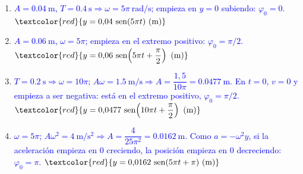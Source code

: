 \begin{exercise}
\begin{center}
        \vspace{6pt}
        \hfill
    \end{center}
    \begin{solu}
        \begin{enumerate}[label=\letraminuscula]
            \item \textcolor{blue}{\(A = \qty{0.04}{\m}\), \(T = \qty{0.4}{\second} \Rightarrow \omega = 5\pi\ \unit{\radian\per\second}\); empieza en \(y = 0\) subiendo: \(\varphi_0 = 0\).}
            \(\textcolor{red}{y = 0{,}04\,\sen(5\pi t)\ \text{(m)}}\)
            \item \textcolor{blue}{\(A = \qty{0.06}{\m}\), \(\omega = 5\pi\); empieza en el extremo positivo: \(\varphi_0 = \pi/2\).}
            \(\textcolor{red}{y = 0{,}06\,\sen\!\left(5\pi t + \dfrac{\pi}{2}\right)\ \text{(m)}}\)
            \item \textcolor{blue}{\(T = \qty{0.2}{\second} \Rightarrow \omega = 10\pi\); \(A\omega = \qty{1.5}{\m\per\second} \Rightarrow A = \dfrac{1{,}5}{10\pi} = \qty{0.0477}{\m}\).
            En \(t = 0\), \(v = 0\) y empieza a ser negativa: está en el extremo positivo, \(\varphi_0 = \pi/2\).}
            \(\textcolor{red}{y = 0{,}0477\,\sen\!\left(10\pi t + \dfrac{\pi}{2}\right)\ \text{(m)}}\)
            \item \textcolor{blue}{\(\omega = 5\pi\); \(A\omega^2 = \qty{4}{\m\per\second\squared} \Rightarrow A = \dfrac{4}{25\pi^2} = \qty{0.0162}{\m}\).
            Como \(a = -\omega^2 y\), si la aceleración empieza en 0 creciendo, la posición empieza en 0 decreciendo: \(\varphi_0 = \pi\).}
            \(\textcolor{red}{y = 0{,}0162\,\sen(5\pi t + \pi)\ \text{(m)}}\)
        \end{enumerate}
    \end{solu}
\end{exercise}

